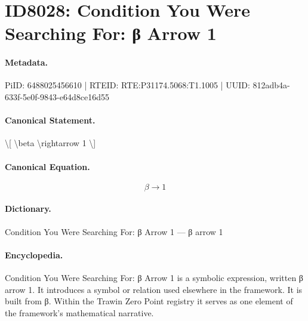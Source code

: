 \section*{ID8028: Condition You Were Searching For: β Arrow 1}
\paragraph{Metadata.}
PiID: 6488025456610 | RTEID: RTE:P31174.5068:T1.1005 | UUID: 812adb4a-633f-5e0f-9843-e64d8ce16d55

\paragraph{Canonical Statement.}
\textbackslash{}[ \textbackslash{}beta \textbackslash{}rightarrow 1 \textbackslash{}]

\paragraph{Canonical Equation.}
\[
\beta \rightarrow 1
\]

\paragraph{Dictionary.}
Condition You Were Searching For: β Arrow 1 — β arrow 1

\paragraph{Encyclopedia.}
Condition You Were Searching For: β Arrow 1 is a symbolic expression, written β arrow 1. It introduces a symbol or relation used elsewhere in the framework. It is built from β. Within the Trawin Zero Point registry it serves as one element of the framework's mathematical narrative.
